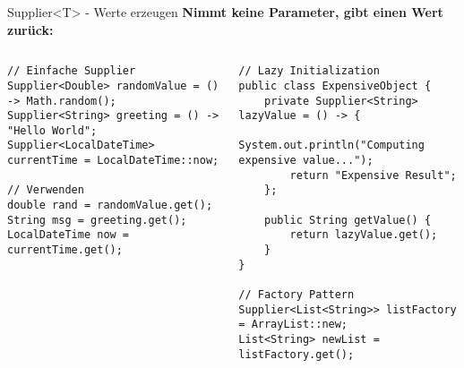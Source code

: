 \begin{frame}[fragile]{Supplier<T> - Werte erzeugen}
  \textbf{Nimmt keine Parameter, gibt einen Wert zurück:}

  \begin{columns}[T]
    \begin{lstlisting}[style=java, basicstyle=\tiny\ttfamily]
// Einfache Supplier
Supplier<Double> randomValue = () -> Math.random();
Supplier<String> greeting = () -> "Hello World";
Supplier<LocalDateTime> currentTime = LocalDateTime::now;

// Verwenden
double rand = randomValue.get();
String msg = greeting.get();
LocalDateTime now = currentTime.get();
    \end{lstlisting}

    \begin{lstlisting}[style=java, basicstyle=\tiny\ttfamily]
// Lazy Initialization
public class ExpensiveObject {
    private Supplier<String> lazyValue = () -> {
        System.out.println("Computing expensive value...");
        return "Expensive Result";
    };

    public String getValue() {
        return lazyValue.get();
    }
}

// Factory Pattern
Supplier<List<String>> listFactory = ArrayList::new;
List<String> newList = listFactory.get();
    \end{lstlisting}
  \end{columns}
\end{frame}

